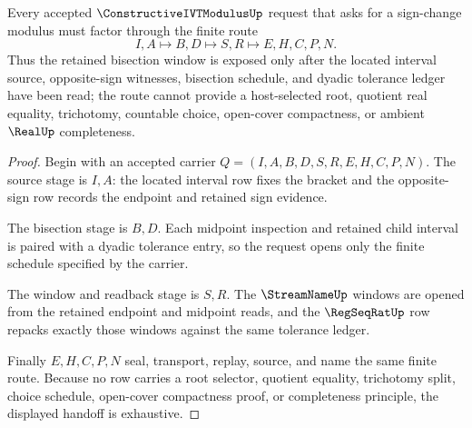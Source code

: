 \begin{theorem}
\label{thm:constructive-ivt-modulus-bisection-window-handoff}
Every accepted $\ConstructiveIVTModulusUp$ request that asks for a sign-change modulus must factor through the finite route
$$
I,A \longmapsto B,D \longmapsto S,R \longmapsto E,H,C,P,N .
$$
Thus the retained bisection window is exposed only after the located interval source, opposite-sign witnesses, bisection schedule, and dyadic tolerance ledger have been read; the route cannot provide a host-selected root, quotient real equality, trichotomy, countable choice, open-cover compactness, or ambient $\RealUp$ completeness.
\end{theorem}
\begin{proof}
Begin with an accepted carrier $Q=(I,A,B,D,S,R,E,H,C,P,N)$. The source stage is $I,A$: the located interval row fixes the bracket and the opposite-sign row records the endpoint and retained sign evidence.

The bisection stage is $B,D$. Each midpoint inspection and retained child interval is paired with a dyadic tolerance entry, so the request opens only the finite schedule specified by the carrier.

The window and readback stage is $S,R$. The $\StreamNameUp$ windows are opened from the retained endpoint and midpoint reads, and the $\RegSeqRatUp$ row repacks exactly those windows against the same tolerance ledger.

Finally $E,H,C,P,N$ seal, transport, replay, source, and name the same finite route. Because no row carries a root selector, quotient equality, trichotomy split, choice schedule, open-cover compactness proof, or completeness principle, the displayed handoff is exhaustive.
\end{proof}


